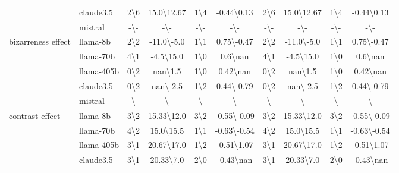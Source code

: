 \begin{table*}[ht!]
\begin{sc}
\begin{tabular}{l|l|cc|cc|cc|cc}
 & claude3.5 & 2\textbackslash6 & 15.0\textbackslash12.67 & 1\textbackslash4 & -0.44\textbackslash0.13 & 2\textbackslash6 & 15.0\textbackslash12.67 & 1\textbackslash4 & -0.44\textbackslash0.13\\
 & mistral & -\textbackslash- & -\textbackslash- & -\textbackslash- & -\textbackslash- & -\textbackslash- & -\textbackslash- & -\textbackslash- & -\textbackslash-\\
\midrule
\multirow{5}{*}{\parbox{1.8cm}{bizarreness effect}} & llama-8b & 2\textbackslash2 & -11.0\textbackslash-5.0 & 1\textbackslash1 & 0.75\textbackslash-0.47 & 2\textbackslash2 & -11.0\textbackslash-5.0 & 1\textbackslash1 & 0.75\textbackslash-0.47\\
 & llama-70b & 4\textbackslash1 & -4.5\textbackslash15.0 & 1\textbackslash0 & 0.6\textbackslash nan & 4\textbackslash1 & -4.5\textbackslash15.0 & 1\textbackslash0 & 0.6\textbackslash nan\\
 & llama-405b & 0\textbackslash2 & nan\textbackslash1.5 & 1\textbackslash0 & 0.42\textbackslash nan & 0\textbackslash2 & nan\textbackslash1.5 & 1\textbackslash0 & 0.42\textbackslash nan\\
 & claude3.5 & 0\textbackslash2 & nan\textbackslash-2.5 & 1\textbackslash2 & 0.44\textbackslash-0.79 & 0\textbackslash2 & nan\textbackslash-2.5 & 1\textbackslash2 & 0.44\textbackslash-0.79\\
 & mistral & -\textbackslash- & -\textbackslash- & -\textbackslash- & -\textbackslash- & -\textbackslash- & -\textbackslash- & -\textbackslash- & -\textbackslash-\\
\midrule
\multirow{5}{*}{\parbox{1.8cm}{contrast effect}} & llama-8b & 3\textbackslash2 & 15.33\textbackslash12.0 & 3\textbackslash2 & -0.55\textbackslash-0.09 & 3\textbackslash2 & 15.33\textbackslash12.0 & 3\textbackslash2 & -0.55\textbackslash-0.09\\
 & llama-70b & 4\textbackslash2 & 15.0\textbackslash15.5 & 1\textbackslash1 & -0.63\textbackslash-0.54 & 4\textbackslash2 & 15.0\textbackslash15.5 & 1\textbackslash1 & -0.63\textbackslash-0.54\\
 & llama-405b & 3\textbackslash1 & 20.67\textbackslash17.0 & 1\textbackslash2 & -0.51\textbackslash1.07 & 3\textbackslash1 & 20.67\textbackslash17.0 & 1\textbackslash2 & -0.51\textbackslash1.07\\
 & claude3.5 & 3\textbackslash1 & 20.33\textbackslash7.0 & 2\textbackslash0 & -0.43\textbackslash nan & 3\textbackslash1 & 20.33\textbackslash7.0 & 2\textbackslash0 & -0.43\textbackslash nan\\

\end{tabular}
\end{sc}
\end{table*}
